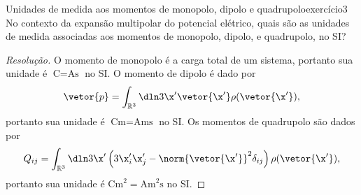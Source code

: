\begin{exercício}{Unidades de medida aos momentos de monopolo, dipolo e quadrupolo}{exercício3}
    No contexto da expansão multipolar do potencial elétrico, quais são as unidades de medida associadas aos momentos de monopolo, dipolo, e quadrupolo, no SI?
\end{exercício}
\begin{proof}[Resolução]
    O momento de monopolo é a carga total de um sistema, portanto sua unidade é \(\unit{\coulomb} = \unit{\ampere \second}\) no SI. O momento de dipolo é dado por
    \begin{equation*}
        \vetor{p} = \int_{\mathbb{R}^3}  \dln3{\x'} \vetor{\x'}\rho(\vetor{\x'}),
    \end{equation*}
    portanto sua unidade é \(\unit{\coulomb \meter} = \unit{\ampere \meter \second}\) no SI. Os momentos de quadrupolo são dados por
    \begin{equation*}
        Q_{ij} = \int_{\mathbb{R}^3} \dln3{\x'} \left(3 \x'_i \x'_j - \norm{\vetor{\x'}}^2 \delta_{ij}\right)\rho(\vetor{\x'}),
    \end{equation*}
    portanto sua unidade é \(\unit{\coulomb \meter^2} = \unit{\ampere \meter^2 \second}\) no SI.
\end{proof}
